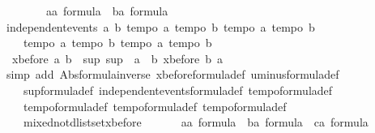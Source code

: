 \begin{isabellebody}
\ \ \isamarkupfalse%
\ \isanewline
\ \ \isamarkupfalse%
\ a{\isacharcolon}{\isacharcolon}{\isachardoublequoteopen}{\isacharprime}a\ formula{\isachardoublequoteclose}\ \ b{\isacharcolon}{\isacharcolon}{\isachardoublequoteopen}{\isacharprime}a\ formula{\isachardoublequoteclose}\isanewline
\ \ \isamarkupfalse%
\ {\isachardoublequoteopen}independent{\isacharunderscore}events\ a\ b{\isachardoublequoteclose}\ {\isachardoublequoteopen}tempo{}\ a{\isachardoublequoteclose}\ {\isachardoublequoteopen}tempo{}\ b{\isachardoublequoteclose}\ {\isachardoublequoteopen}tempo{}\ a{\isachardoublequoteclose}\ {\isachardoublequoteopen}tempo{}\ b{\isachardoublequoteclose}\isanewline
\ \ \ \ {\isachardoublequoteopen}tempo{}\ a{\isachardoublequoteclose}\ {\isachardoublequoteopen}tempo{}\ b{\isachardoublequoteclose}\ {\isachardoublequoteopen}tempo{}\ a{\isachardoublequoteclose}\ {\isachardoublequoteopen}tempo{}\ b{\isachardoublequoteclose}\isanewline
\ \ \isamarkupfalse%
\ {\isachardoublequoteopen}{\isacharparenleft}{\isacharminus}\ xbefore\ a\ b{\isacharparenright}\ {\isacharequal}\ {\isacharparenleft}sup\ {\isacharparenleft}sup\ {\isacharparenleft}{\isacharminus}\ a{\isacharparenright}\ {\isacharparenleft}{\isacharminus}\ b{\isacharparenright}{\isacharparenright}\ {\isacharparenleft}xbefore\ b\ a{\isacharparenright}{\isacharparenright}{\isachardoublequoteclose}\isanewline
\ \ \isamarkupfalse%
\ {\isacharparenleft}simp\ add{\isacharcolon}\ Abs{\isacharunderscore}formula{\isacharunderscore}inverse\ xbefore{\isacharunderscore}formula{\isacharunderscore}def\ uminus{\isacharunderscore}formula{\isacharunderscore}def\ \isanewline
\ \ \ \ sup{\isacharunderscore}formula{\isacharunderscore}def\ independent{\isacharunderscore}events{\isacharunderscore}formula{\isacharunderscore}def\ tempo{}{\isacharunderscore}formula{\isacharunderscore}def\ \isanewline
\ \ \ \ tempo{}{\isacharunderscore}formula{\isacharunderscore}def\ tempo{}{\isacharunderscore}formula{\isacharunderscore}def\ tempo{}{\isacharunderscore}formula{\isacharunderscore}def\ \ \isanewline
\ \ \ \ mixed{\isacharunderscore}not{\isacharunderscore}dlistset{\isacharunderscore}xbefore{\isacharparenright}\isanewline
\ \ \isamarkupfalse%
\isanewline
\ \ \isamarkupfalse%
\ a{\isacharcolon}{\isacharcolon}{\isachardoublequoteopen}{\isacharprime}a\ formula{\isachardoublequoteclose}\ \ b{\isacharcolon}{\isacharcolon}{\isachardoublequoteopen}{\isacharprime}a\ formula{\isachardoublequoteclose}\ \ c{\isacharcolon}{\isacharcolon}{\isachardoublequoteopen}{\isacharprime}a\ formula{\isachardoublequoteclose}\isanewline

\end{isabellebody}
